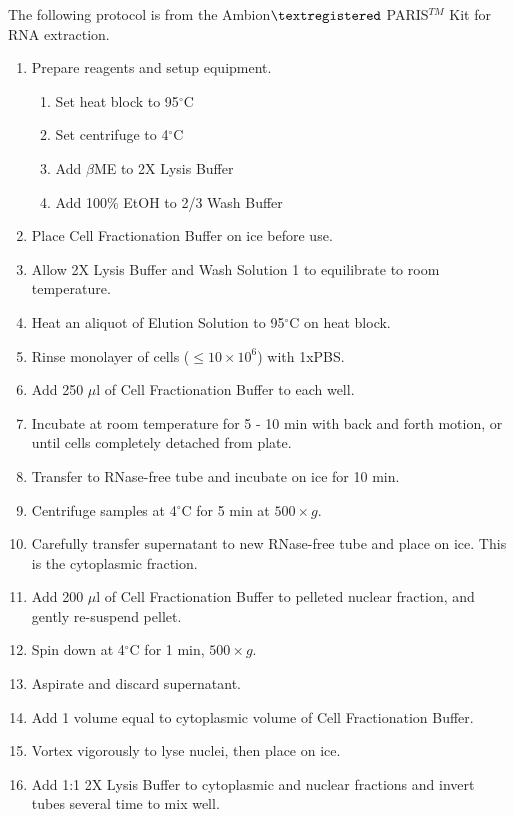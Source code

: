 \noindent The following protocol is from the Ambion$\textregistered$ PARIS$^{TM}$ Kit for RNA extraction.
\begin{enumerate}
\item Prepare reagents and setup equipment.
  \begin{enumerate}
  \item Set heat block to 95$^{\circ}$C
  \item Set centrifuge to 4$^{\circ}$C
  \item Add $\beta$ME to 2X Lysis Buffer\footnotemark {}
  \item Add 100\% EtOH to 2/3 Wash Buffer\footnotemark {}
  \end{enumerate}
\item Place Cell Fractionation Buffer on ice before use.
\item Allow 2X Lysis Buffer and Wash Solution 1 to equilibrate to room temperature.
\item Heat an aliquot of Elution Solution to 95$^{\circ}$C on heat block.
\item Rinse monolayer of cells ($\le 10 \times 10^6$) with 1xPBS.
\item Add 250 $\mu$l of Cell Fractionation Buffer to each well\footnotemark.
\item Incubate at room temperature for 5 - 10 min with back and forth motion, or until cells completely detached from plate.
\item Transfer to RNase-free tube and incubate on ice for 10 min.
\item Centrifuge samples at 4$^{\circ}$C for 5 min at $500 \times g$.
\item Carefully transfer supernatant to new RNase-free tube and place on ice. This is the cytoplasmic fraction.
\item Add 200 $\mu$l of Cell Fractionation Buffer to pelleted nuclear fraction, and gently re-suspend pellet.
\item Spin down at 4$^{\circ}$C for 1 min, $500 \times g$.
\item Aspirate and discard supernatant.
\item Add 1 volume equal to cytoplasmic volume of Cell Fractionation Buffer.
\item Vortex vigorously to lyse nuclei, then place on ice.
\item Add 1:1 2X Lysis Buffer to cytoplasmic and nuclear fractions and invert tubes several time to mix well.

\end{enumerate}
